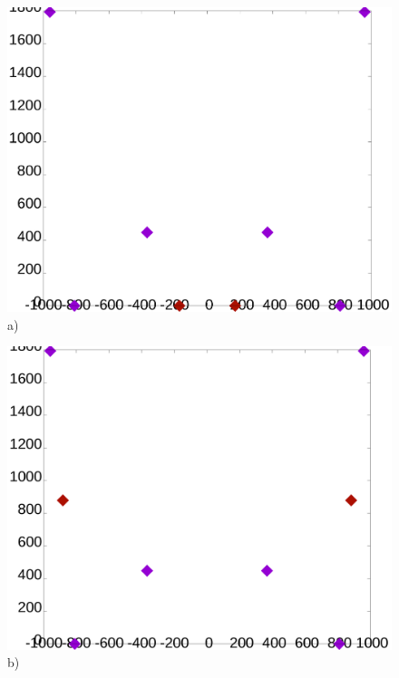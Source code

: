 \documentclass[12pt]{article}
\theoremstyle{theorem}
\theoremstyle{dfn}
\theoremstyle{remark}
\begin{document}
\begin{figure}[h!]
	\begin{minipage}[h]{0.32\linewidth}
		\begin{center}
			\includegraphics[width=1\linewidth]{./img/8_2520_143_symm1.png}\\ a)
		\end{center}
	\end{minipage}
	\hfill
	\begin{minipage}[h]{0.32\linewidth}
		\begin{center}
			\includegraphics[width=1\linewidth]{./img/8_2520_143_symm2.png}\\ b)

\end{center}
\end{minipage}
\end{figure}
\end{document}

